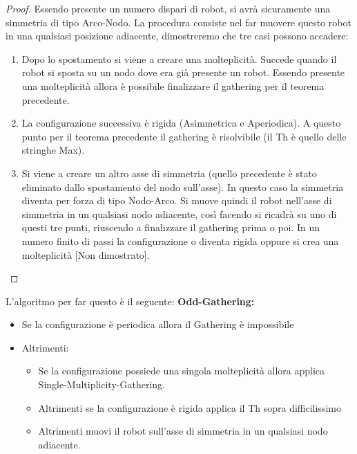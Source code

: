 \begin{proof}
    Essendo presente un numero dispari di robot, si avrà sicuramente una simmetria
    di tipo Arco-Nodo. La procedura consiste nel far muovere questo robot in una
    qualsiasi posizione adiacente, dimostreremo che tre casi possono accadere:
    \begin{enumerate}
        \item Dopo lo spostamento si viene a creare una molteplicità. Succede quando
              il robot si sposta su un nodo dove era già presente un robot. Essendo
              presente una molteplicità allora è possibile finalizzare il gathering per il
              teorema precedente.
        \item La configurazione successiva è rigida (Asimmetrica e Aperiodica). A
              questo punto per il teorema precedente il gathering è risolvibile (il Th è
              quello delle stringhe Max).
        \item Si viene a creare un altro asse di simmetria (quello precedente è
              stato eliminato dallo spostamento del nodo sull'asse). In questo caso la
              simmetria diventa per forza di tipo Nodo-Arco. Si muove quindi il robot
              nell'asse di simmetria in un qualsiasi nodo adiacente, così facendo si
              ricadrà su uno di questi tre punti, riuscendo a finalizzare il gathering
              prima o poi. In un numero finito di passi la configurazione o diventa rigida
              oppure si crea una molteplicità [Non dimostrato].
    \end{enumerate}
\end{proof}
L'algoritmo per far questo è il seguente:
\textbf{Odd-Gathering:}
\begin{itemize}
    \item Se la configurazione è periodica allora il Gathering è impossibile
    \item Altrimenti:
          \begin{itemize}
              \item Se la configurazione possiede una singola molteplicità allora
                    applica Single-Multiplicity-Gathering.
              \item Altrimenti se la configurazione è rigida applica il Th sopra
                    difficilissimo
              \item Altrimenti muovi il robot sull'asse di simmetria in un qualsiasi
                    nodo adiacente.
          \end{itemize}
\end{itemize}

